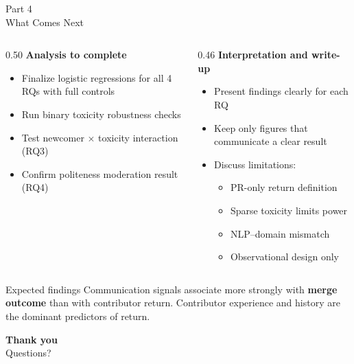 \documentclass[aspectratio=169,11pt]{beamer}
\begin{document}
\begin{frame}{Part 4\\What Comes Next}

\begin{columns}[T]
\begin{column}{0.50\textwidth}
\textbf{Analysis to complete}
\begin{itemize}
  \item Finalize logistic regressions for all 4 RQs with full controls
  \item Run binary toxicity robustness checks
  \item Test newcomer $\times$ toxicity interaction (RQ3)
  \item Confirm politeness moderation result (RQ4)
\end{itemize}
\end{column}

\begin{column}{0.46\textwidth}
\textbf{Interpretation and write-up}
\begin{itemize}
  \item Present findings clearly for each RQ
  \item Keep only figures that communicate a clear result
  \item Discuss limitations:
  \begin{itemize}
    \item PR-only return definition
    \item Sparse toxicity limits power
    \item NLP–domain mismatch
    \item Observational design only
  \end{itemize}
\end{itemize}
\end{column}
\end{columns}

\vspace{0.2em}
\begin{exampleblock}{Expected findings}
Communication signals associate more strongly with \textbf{merge outcome} than with contributor return.
Contributor experience and history are the dominant predictors of return.
\end{exampleblock}

\end{frame}

\begin{frame}
\vfill
\begin{center}
  {\Huge\bfseries Thank you}\\[0.8em]
  {\large Questions?}
\end{center}
\vfill
\end{frame}
\end{document}
